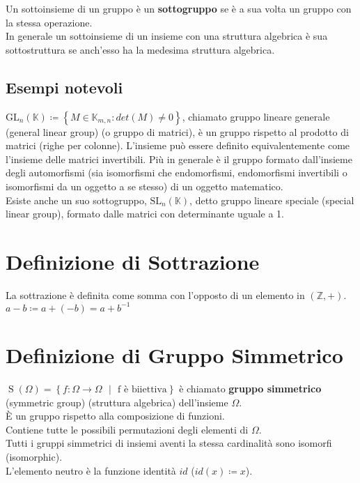 \documentclass[a4paper, twoside, italian, 11pt]{book}
\newcommand{\braces}[1] {\left \{ #1 \right \}}
\DeclareMathOperator{\Sg}{S}
\newcommand{\Z}{\mathbb Z}
\newcommand{\K}{\mathbb K}
\begin{document}
Un sottoinsieme di un gruppo è un \textbf{sottogruppo} se è a sua volta un gruppo con la stessa operazione. \\

\noindent
In generale un sottoinsieme di un insieme con una struttura algebrica è sua sottostruttura se anch'esso ha la medesima struttura algebrica.


\subsection{Esempi notevoli}

$\text{GL}_n(\K) \coloneqq \braces{M \in \K_{m,n} : det(M) \neq 0}$, chiamato gruppo lineare generale (general linear group) (o gruppo di matrici), è un gruppo rispetto al prodotto di matrici (righe per colonne). L'insieme può essere definito equivalentemente come l'insieme delle matrici invertibili. Più in generale è il gruppo formato dall'insieme degli automorfismi (sia isomorfismi che endomorfismi, endomorfismi invertibili o isomorfismi da un oggetto a se stesso) di un oggetto matematico. \\

\noindent
Esiste anche un suo sottogruppo, $\text{SL}_n(\K)$, detto gruppo lineare speciale (special linear group), formato dalle matrici con determinante uguale a 1.



\section{Definizione di Sottrazione}

La sottrazione è definita come somma con l'opposto di un elemento in $(\Z, +)$. \\

$a - b \coloneqq a + (-b) = a + b^{-1}$



\section{Definizione di Gruppo Simmetrico}

$\Sg(\Omega) = \braces{f : \Omega \rightarrow \Omega \text{ $|$ } \text{f è biiettiva}}$ è chiamato \textbf{gruppo simmetrico} (symmetric group) (struttura algebrica) dell'insieme $\Omega$. \\

\noindent
È un gruppo rispetto alla composizione di funzioni. \\
Contiene tutte le possibili permutazioni degli elementi di $\Omega$. \\
Tutti i gruppi simmetrici di insiemi aventi la stessa cardinalità sono isomorfi (isomorphic). \\
L'elemento neutro è la funzione identità $id$ ($id(x) \coloneqq x$).
\end{document}
